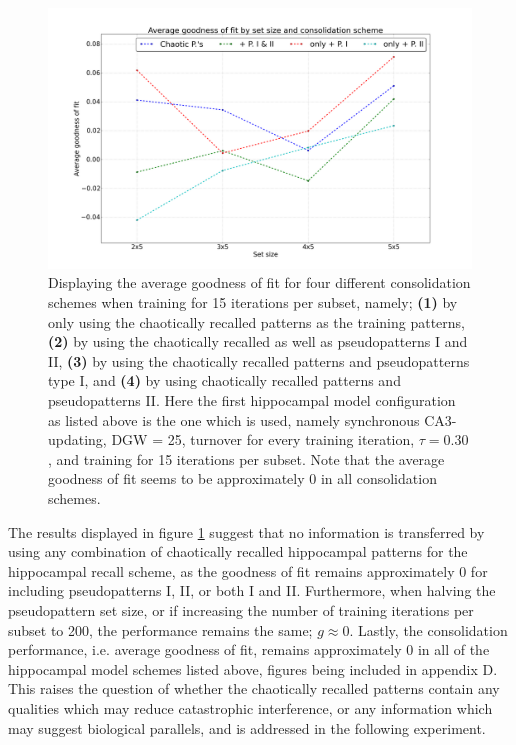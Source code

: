 \begin{figure}
    \centering
    \includegraphics[width=14cm]{fig/neo-consolidation/consolidation-schemes-sync-tm1-tr30_15_iters}
    \caption{Displaying the average goodness of fit for four different consolidation schemes when training for 15 iterations per subset, namely; \textbf{(1)} by only using the chaotically recalled patterns as the training patterns, \textbf{(2)} by using the chaotically recalled as well as pseudopatterns I and II, \textbf{(3)} by using the chaotically recalled patterns and pseudopatterns type I, and \textbf{(4)} by using chaotically recalled patterns and pseudopatterns II. Here the first hippocampal model configuration as listed above is the one which is used, namely synchronous CA3-updating, DGW = 25, turnover for every training iteration, $\tau=0.30$, and training for 15 iterations per subset. Note that the average goodness of fit seems to be approximately 0 in all consolidation schemes.}
    \label{fig:consolidation-schemes-sync}
\end{figure}

The results displayed in figure \ref{fig:consolidation-schemes-sync} suggest that no information is transferred by using any combination of chaotically recalled hippocampal patterns for the hippocampal recall scheme, as the goodness of fit remains approximately 0 for including pseudopatterns I, II, or both I and II. Furthermore, when halving the pseudopattern set size, or if increasing the number of training iterations per subset to 200, the performance remains the same; $g\approx 0$. Lastly, the consolidation performance, i.e. average goodness of fit, remains approximately $0$ in all of the hippocampal model schemes listed above, figures being included in appendix D. 
This raises the question of whether the chaotically recalled patterns contain any qualities which may reduce catastrophic interference, or any information which may suggest biological parallels, and is addressed in the following experiment.

